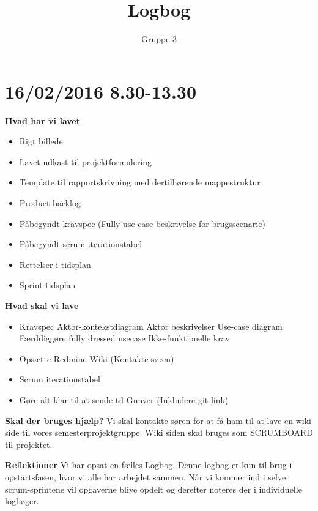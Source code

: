 \documentclass{article}
\title{Logbog}
\author{Gruppe 3}
\date{}
\begin{document}
	\maketitle
	\tableofcontents
	
	\section{16/02/2016 8.30-13.30}
	
	\textbf{Hvad har vi lavet}
	\begin{itemize}
		\item Rigt billede
		\item Lavet udkast til projektformulering
		\item Template til rapportskrivning med dertilhørende mappestruktur
		\item Product backlog
		\item Påbegyndt kravspec (Fully use case beskrivelse for brugsscenarie)
		\item Påbegyndt scrum iterationstabel
		\item Rettelser i tidsplan
		\item Sprint tidsplan
	\end{itemize}
	
	\textbf{Hvad skal vi lave}
	\begin{itemize}
		\item Kravspec
		\subitem Aktør-kontekstdiagram
		\subitem Aktør beskrivelser
		\subitem Use-case diagram
		\subitem Færddiggøre fully dressed usecase
		\subitem Ikke-funktionelle krav
		
		\item Opsætte Redmine Wiki (Kontakte søren)
		\item Scrum iterationstabel
		\item Gøre alt klar til at sende til Gunver (Inkludere git link)
		
	\end{itemize}
	\textbf{Skal der bruges hjælp?}
	Vi skal kontakte søren for at få ham til at lave en wiki side til vores semesterprojektgruppe. Wiki siden skal bruges som SCRUMBOARD til projektet.
	
	
	\textbf{Reflektioner}
	Vi har opsat en fælles Logbog. Denne logbog er kun til brug i opstartsfasen, hvor vi alle har arbejdet sammen. Når vi kommer ind i selve scrum-sprintene vil opgaverne blive opdelt og derefter noteres der i individuelle logbøger. 
	
	
\end{document}
